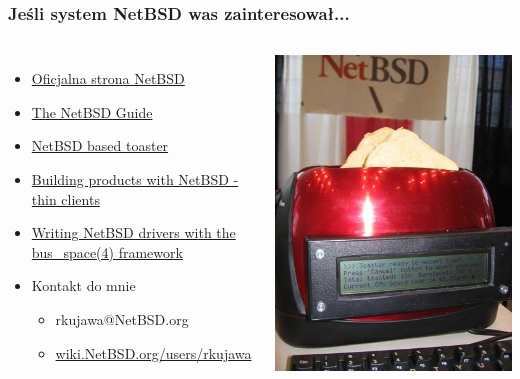 \documentclass[dvipsnames,table]{beamer}
\begin{document}
\begin{frame}
\frametitle{Jeśli system NetBSD was zainteresował...}
\begin{columns}[c]
\column{3in}

\begin{itemize}
	\item \href{http://www.NetBSD.org/}{Oficjalna strona NetBSD }
	\item \href{http://www.netbsd.org/docs/guide/en/}{The NetBSD Guide}
	\item \href{http://www.embeddedarm.com/software/arm-netbsd-toaster.php}{NetBSD based toaster}
	\item \href{http://misc.allbsd.de/Vortrag/EuroBSDCon_2007/Stephen_Borrill/eurobsdcon.pdf}{Building products with NetBSD - thin clients}
	\item \href{http://cloud.github.com/downloads/rkujawa/busspace-tutorial/bus_space_tutorial.pdf}{Writing NetBSD drivers with the bus\_space(4) framework}
	\item Kontakt do mnie
	\begin{itemize}
		\item rkujawa@NetBSD.org
		\item \href{http://wiki.NetBSD.org/users/rkujawa}{wiki.NetBSD.org/users/rkujawa}
	\end{itemize}
\end{itemize}

\column{1.5in}
	\includegraphics[scale=0.4]{img_netbsdtoaster.jpg}
\end{columns}

\end{frame}
\end{document}
